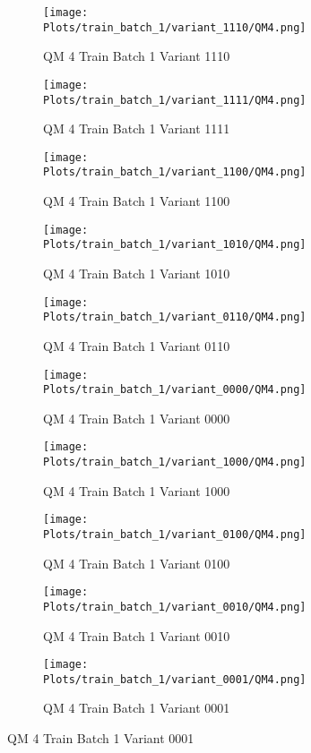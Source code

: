 \documentclass{DissertateFigs}
\begin{document}
\begin{figure}[t!]
    \begin{subfigure}{0.47\textwidth}
    \texttt{[image: Plots/train\_batch\_1/variant\_1110/QM4.png]}
    \caption{QM 4 Train Batch 1 Variant 1110}
    \end{subfigure}
    \begin{subfigure}{0.47\textwidth}
    \texttt{[image: Plots/train\_batch\_1/variant\_1111/QM4.png]}
    \caption{QM 4 Train Batch 1 Variant 1111}
    \end{subfigure}

\medskip

    \begin{subfigure}{0.47\textwidth}
    \texttt{[image: Plots/train\_batch\_1/variant\_1100/QM4.png]}
    \caption{QM 4 Train Batch 1 Variant 1100}
    \end{subfigure}
    \begin{subfigure}{0.47\textwidth}
    \texttt{[image: Plots/train\_batch\_1/variant\_1010/QM4.png]}
    \caption{QM 4 Train Batch 1 Variant 1010}
    \end{subfigure}

\medskip

    \begin{subfigure}{0.47\textwidth}
    \texttt{[image: Plots/train\_batch\_1/variant\_0110/QM4.png]}
    \caption{QM 4 Train Batch 1 Variant 0110}
    \end{subfigure}
    \begin{subfigure}{0.47\textwidth}
    \texttt{[image: Plots/train\_batch\_1/variant\_0000/QM4.png]}
    \caption{QM 4 Train Batch 1 Variant 0000}
    \end{subfigure}

\medskip

    \begin{subfigure}{0.47\textwidth}
    \texttt{[image: Plots/train\_batch\_1/variant\_1000/QM4.png]}
    \caption{QM 4 Train Batch 1 Variant 1000}
    \end{subfigure}
    \begin{subfigure}{0.47\textwidth}
    \texttt{[image: Plots/train\_batch\_1/variant\_0100/QM4.png]}
    \caption{QM 4 Train Batch 1 Variant 0100}
    \end{subfigure}

\medskip

    \begin{subfigure}{0.47\textwidth}
    \texttt{[image: Plots/train\_batch\_1/variant\_0010/QM4.png]}
    \caption{QM 4 Train Batch 1 Variant 0010}
    \end{subfigure}
    \begin{subfigure}{0.47\textwidth}
    \texttt{[image: Plots/train\_batch\_1/variant\_0001/QM4.png]}
    \caption{QM 4 Train Batch 1 Variant 0001}
    \end{subfigure}


\end{figure}
\end{document}
